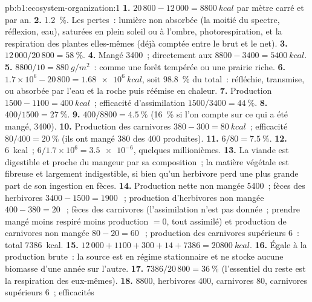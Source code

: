 \begin{solution}{pb:b1:ecosystem-organization:1}
\textbf{1.} $20\,800 - 12\,000 = \qty{8800}{kcal}$ par mètre carré et
par an.
\textbf{2.} \qty{1.2}{\%}. Les pertes~: lumière non absorbée (la moitié
du spectre, réflexion, eau),  saturées en plein soleil ou à
l'ombre, photorespiration, et la respiration des plantes elles-mêmes
(déjà comptée entre le brut et le net).
\textbf{3.} $12\,000/20\,800 = \qty{58}{\%}$.
\textbf{4.} Mangé \qty{3400}{}~; directement aux 
$8800 - 3400 = \qty{5400}{kcal}$.
\textbf{5.} $8800/10 = \qty{880}{g/m^2}$~: comme une forêt tempérée ou
une prairie riche.
\textbf{6.} $1.7\times 10^6 - 20\,800 = \qty{1.68e6}{kcal}$, soit
\qty{98.8}{\%} du total~: réfléchie, transmise, ou absorbée par l'eau et
la roche puis réémise en chaleur.
\textbf{7.} Production $1500 - 1100 = \qty{400}{kcal}$~; efficacité
d'assimilation $1500/3400 = \qty{44}{\%}$.
\textbf{8.} $400/1500 = \qty{27}{\%}$.
\textbf{9.} $400/8800 = \qty{4.5}{\%}$ (\qty{16}{\%} si l'on compte sur
ce qui a été mangé, \qty{3400}{}).
\textbf{10.} Production des carnivores $380 - 300 = \qty{80}{kcal}$~;
efficacité $80/400 = \qty{20}{\%}$ (ils ont mangé \qty{380}{} des
\qty{400}{} produites).
\textbf{11.} $6/80 = \qty{7.5}{\%}$.
\textbf{12.} \qty{6}{kcal}~; $6/1.7\times 10^6 = \num{3.5e-6}$, quelques
millionièmes.
\textbf{13.} La viande est digestible et proche du mangeur par sa
composition~; la matière végétale est fibreuse et largement
indigestible, si bien qu'un herbivore perd une plus grande part de son
ingestion en fèces.
\textbf{14.} Production nette non mangée \qty{5400}{}~; fèces des
herbivores $3400 - 1500 = \qty{1900}{}$~; production d'herbivores non
mangée $400 - 380 = \qty{20}{}$~; fèces des carnivores (l'assimilation
n'est pas donnée~; prendre mangé moins respiré moins production $= 0$,
tout assimilé) et production de carnivores non mangée
$80 - 20 = \qty{60}{}$~; production des carnivores supérieurs
\qty{6}{}~: total \qty{7386}{kcal}.
\textbf{15.} $12\,000 + 1100 + 300 + 14 + 7386 = \qty{20800}{kcal}$.
\textbf{16.} Égale à la production brute~: la source est en régime
stationnaire et ne stocke aucune biomasse d'une année sur l'autre.
\textbf{17.} $7386/20\,800 = \qty{36}{\%}$ (l'essentiel du reste est la
respiration des  eux-mêmes).
\textbf{18.}  \qty{8800}{}, herbivores \qty{400}{},
carnivores \qty{80}{}, carnivores supérieurs \qty{6}{}~; efficacités

\end{solution}
